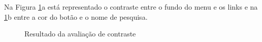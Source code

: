 Na Figura \ref{fig:contraste1}a está representado o contraste entre o fundo do menu e os links e na \ref{fig:contraste1}b entre a cor do botão e o nome de pesquisa.
\begin{figure}[h!]
  \centering
    \caption{Resultado da avaliação de contraste}
    \label{fig:contraste1}
\end{figure}


